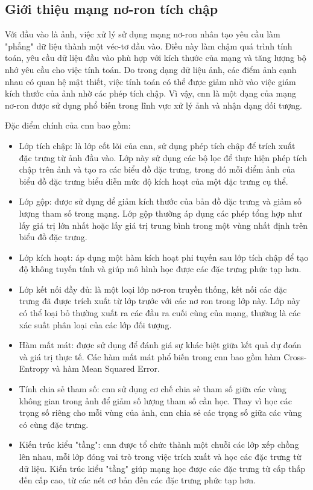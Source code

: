 \subsection{Giới thiệu mạng nơ-ron tích chập}

Với đầu vào là ảnh, việc xử lý sử dụng mạng nơ-ron nhân tạo yêu cầu làm "phẳng" dữ liệu thành một véc-tơ đầu vào. Điều này làm chậm quá trình tính toán, yêu cầu dữ liệu đầu vào phù hợp với kích thước của mạng và tăng lượng bộ nhớ yêu cầu cho việc tính toán. Do trong dạng dữ liệu ảnh, các điểm ảnh cạnh nhau có quan hệ mật thiết, việc tính toán có thể được giảm nhờ vào việc giảm kích thước của ảnh nhờ các phép tích chập. Vì vậy, \acrshort{cnn} là một dạng của mạng nơ-ron \cite{oshea2015introduction} được sử dụng phổ biến trong lĩnh vực xử lý ảnh và nhận dạng đối tượng.

Đặc điểm chính của \acrshort{cnn} bao gồm:

\begin{itemize}
	\item Lớp tích chập: là lớp cốt lõi của \acrshort{cnn}, sử dụng phép tích chập để trích xuất đặc trưng từ ảnh đầu vào. Lớp này sử dụng các bộ lọc để thực hiện phép tích chập trên ảnh và tạo ra các biểu đồ đặc trưng, trong đó mỗi điểm ảnh của biểu đồ đặc trưng biểu diễn mức độ kích hoạt của một đặc trưng cụ thể.
	
	\item Lớp gộp: được sử dụng để giảm kích thước của bản đồ đặc trưng và giảm số lượng tham số trong mạng. Lớp gộp thường áp dụng các phép tổng hợp như lấy giá trị lớn nhất hoặc lấy giá trị trung bình trong một vùng nhất định trên biểu đồ đặc trưng.
	
	\item Lớp kích hoạt: áp dụng một hàm kích hoạt phi tuyến sau lớp tích chập để tạo độ không tuyến tính và giúp mô hình học được các đặc trưng phức tạp hơn.
	
	\item Lớp kết nối đầy đủ: là một loại lớp nơ-ron truyền thống, kết nối các đặc trưng đã được trích xuất từ lớp trước với các nơ ron trong lớp này. Lớp này có thể loại bỏ thường xuất ra các đầu ra cuối cùng của mạng, thường là các xác suất phân loại của các lớp đối tượng.
	
	\item Hàm mất mát: được sử dụng để đánh giá sự khác biệt giữa kết quả dự đoán và giá trị thực tế. Các hàm mất mát phổ biến trong \acrshort{cnn} bao gồm hàm Cross-Entropy và hàm Mean Squared Error.
	
	\item Tính chia sẻ tham số: \acrshort{cnn} sử dụng cơ chế chia sẻ tham số giữa các vùng không gian trong ảnh để giảm số lượng tham số cần học. Thay vì học các trọng số riêng cho mỗi vùng của ảnh, \acrshort{cnn} chia sẻ các trọng số giữa các vùng có cùng đặc trưng.
	
	\item Kiến trúc kiểu "tầng": \acrshort{cnn} được tổ chức thành một chuỗi các lớp xếp chồng lên nhau, mỗi lớp đóng vai trò trong việc trích xuất và học các đặc trưng từ dữ liệu. Kiến trúc kiểu "tầng" giúp mạng học được các đặc trưng từ cấp thấp đến cấp cao, từ các nét cơ bản đến các đặc trưng phức tạp hơn.
\end{itemize}

